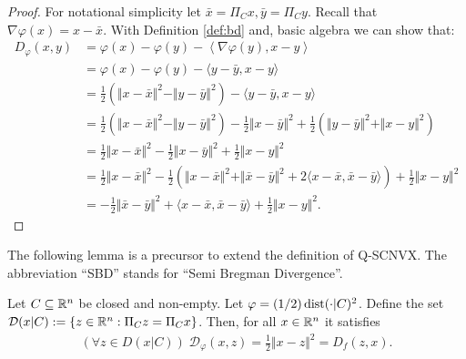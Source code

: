 \documentclass[12pt]{article}
\begin{document}
    \begin{proof}
        For notational simplicity let $\bar x = \Pi_C x, \bar y = \Pi_C y$. 
        Recall that $\nabla \varphi (x) = x - \bar x$. 
        With Definition \ref{def:bd} and, basic algebra we can show that: 
        \begin{align*}
            D_{\varphi}(x, y) &= 
            \varphi(x) - \varphi(y) - \left\langle \nabla \varphi(y), x - y\right\rangle
            \\
            &= \varphi(x) - \varphi(y) - \langle y - \bar y, x - y\rangle
            \\
            &= \frac{1}{2}(\Vert x - \bar x\Vert^2 - \Vert y - \bar y\Vert^2)
            - \langle y - \bar y, x - y\rangle
            \\
            &= \frac{1}{2}(\Vert x - \bar x\Vert^2 - \Vert y - \bar y\Vert^2)
            - \frac{1}{2}\Vert x - \bar y\Vert^2 
            + \frac{1}{2}\left(
                \Vert y - \bar y\Vert^2 + \Vert x - y\Vert^2
            \right)
            \\ 
            &= \frac{1}{2}\Vert x - \bar x\Vert^2
            - \frac{1}{2}\Vert x - \bar y\Vert^2 + \frac{1}{2}\Vert x - y\Vert^2
            \\
            &= 
            \frac{1}{2}\Vert x - \bar x\Vert^2
            - \frac{1}{2}\left(
                \Vert x - \bar x\Vert^2 + \Vert \bar x - \bar y\Vert^2
                + 2\langle x - \bar x, \bar x - \bar y\rangle
            \right)
            + \frac{1}{2}\Vert x - y\Vert^2
            \\
            &= - \frac{1}{2}\Vert \bar x - \bar y\Vert^2 + \langle x - \bar x, \bar x - \bar y\rangle 
            + \frac{1}{2}\Vert x - y \Vert^2. 
        \end{align*}
    \end{proof}
    \par
    The following lemma is a precursor to extend the definition of Q-SCNVX. 
    The abbreviation ``SBD'' stands for ``Semi Bregman Divergence''. 
    \begin{lemma}
        Let $C \subseteq \mathbb R^n$ be closed and non-empty. 
        Let $\varphi = (1/2)\operatorname{dist}(\cdot | C)^2$.
        Define the set $\mathcal D(x | C) := \{z \in \mathbb R^n : \Pi_C z = \Pi_C x\}$. 
        Then, for all $x \in \mathbb R^n$ it satisfies
        \begin{align*}
            (\forall z \in D(x | C))\; \mathcal D_\varphi(x, z) = \frac{1}{2}\Vert x - z\Vert^2 = D_f(z, x). 
        \end{align*}
    \end{lemma}
\end{document}
